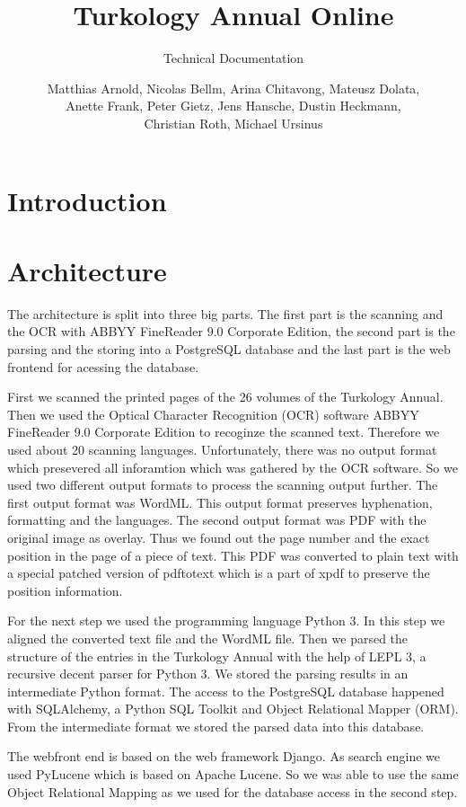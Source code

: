 \documentclass{scrartcl}
\title{Turkology Annual Online}
\subtitle{Technical Documentation}
\author{Matthias Arnold, Nicolas Bellm, Arina Chitavong, Mateusz Dolata,
\\Anette Frank, Peter Gietz, Jens Hansche, Dustin Heckmann, \\Christian Roth,
Michael Ursinus}
\begin{document}
\maketitle
\section{Introduction}

\section{Architecture}
The architecture is split into three big parts. The first part is the scanning
and the OCR with ABBYY FineReader 9.0 Corporate Edition, the second part is the
parsing and the storing into a PostgreSQL database and the last part is the web
frontend for acessing the database.

First we scanned the printed pages of the 26 volumes of the Turkology Annual.
Then we used the Optical Character Recognition (OCR) software ABBYY FineReader
9.0 Corporate Edition to recoginze the scanned text. Therefore we used about 20
scanning languages. Unfortunately, there was no output format which presevered
all inforamtion which was gathered by the OCR software. So we used two different
output formats to process the scanning output further. The first output format
was WordML. This output format preserves hyphenation, formatting and the
languages. The second output format was PDF with the original image as overlay.
Thus we found out the page number and the exact position in the page of a piece
of text. This PDF was converted to plain text with a special patched version of
pdftotext which is a part of xpdf to preserve the position information.

For the next step we used the programming language Python 3. In this step we
aligned the converted text file and the WordML file. Then we parsed the
structure of the entries in the Turkology Annual with the help of LEPL 3, a
recursive decent parser for Python 3. We stored the parsing results in an
intermediate Python format. The access to the PostgreSQL database happened with
SQLAlchemy, a Python SQL Toolkit and Object Relational Mapper (ORM). From the
intermediate format we stored the parsed data into this database.

The webfront end is based on the web framework Django. As search engine we used
PyLucene which is based on Apache Lucene. So we was able to use the same Object
Relational Mapping as we used for the database access in the second step.
\end{document}
